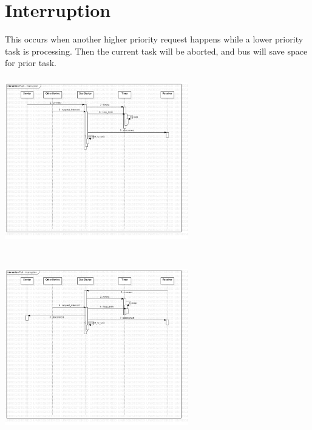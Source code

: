 \documentclass[12pt,article]{memoir}
\begin{document}
\newpage
\section{Interruption}
This occurs when another higher priority request happens while a lower priority task is processing. Then the current task will be aborted, and bus will save space for prior task.\\
\includegraphics[width=8cm,height=8cm]{img/DR00012_Push_Interruption.jpg}
\includegraphics[width=8cm,height=8cm]{img/DR00012_Pull_Interruption.jpg}
\end{document}
